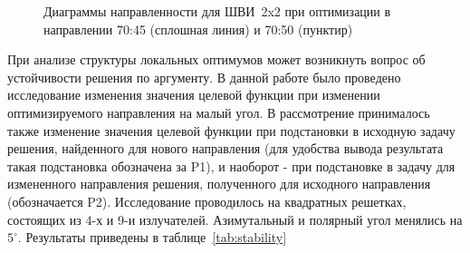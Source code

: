 \begin{figure}[h]
    \centering
    \vspace{0.7em}
    \caption{Диаграммы направленности для ШВИ~2x2 при оптимизации в направлении 70:45 (сплошная линия) и 70:50 (пунктир)}
    \label{ris:bve_stability}
\end{figure}
При анализе структуры локальных оптимумов может возникнуть вопрос об устойчивости решения по аргументу. В данной работе было проведено исследование изменения значения целевой функции при изменении оптимизируемого направления на малый угол. В рассмотрение принималось также изменение значения целевой функции при подстановки в исходную задачу решения, найденного для нового направления (для удобства вывода результата такая подстановка обозначена за P1), и наоборот - при подстановке в задачу для измененного направления решения, полученного для исходного направления (обозначается P2). Исследование проводилось на квадратных решетках, состоящих из 4-х и 9-и излучателей. Азимутальный и полярный угол менялись на $5^{\circ}$. Результаты приведены в таблице~\ref{tab:stability}
